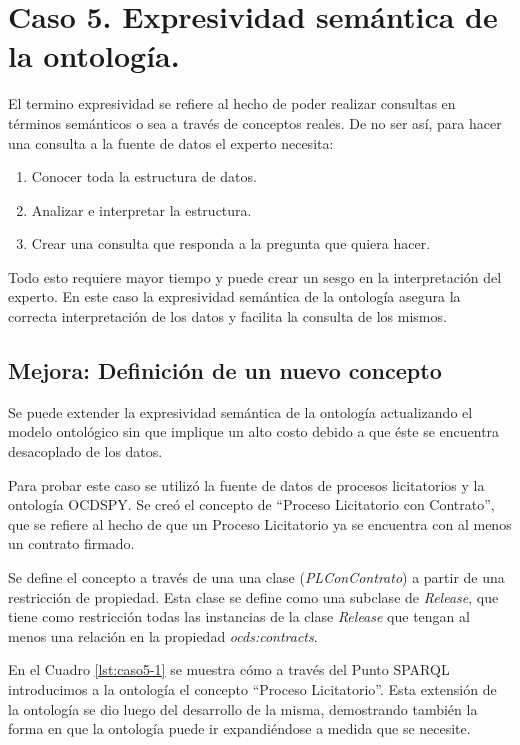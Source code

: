 \section{Caso 5. Expresividad semántica de la ontología. }
\label{section:caso5}

El termino expresividad se refiere al hecho de poder realizar consultas en términos semánticos o sea a través de conceptos reales. De no ser así, para hacer una consulta a la fuente de datos el experto necesita:

\begin{enumerate}
    \item Conocer toda la estructura de datos.
    \item Analizar e interpretar la estructura.
    \item Crear una consulta que responda a la pregunta que quiera hacer.
\end{enumerate}

Todo esto requiere mayor tiempo y puede crear un sesgo en la interpretación del experto. En este caso la expresividad semántica de la ontología asegura la correcta interpretación de los datos y facilita la consulta de los mismos.


\subsection{Mejora: Definición de un nuevo concepto}
Se puede extender la expresividad semántica de la ontología actualizando el modelo ontológico sin que implique un alto costo debido a que éste se encuentra desacoplado de los datos.

Para probar este caso se utilizó la fuente de datos de procesos licitatorios y la ontología OCDSPY.  Se creó el  concepto  de “Proceso Licitatorio con Contrato”, que se refiere al hecho de que un Proceso Licitatorio ya se encuentra con al menos un contrato firmado.

Se define el concepto a través de una una clase (\textit{PLConContrato}) a partir de una restricción de propiedad. Esta clase se define como una subclase de \textit{Release}, que tiene como restricción todas las instancias de la clase \textit{Release} que tengan al menos una relación en la propiedad \textit{ocds:contracts}.

En el Cuadro \ref{lst:caso5-1} se muestra cómo a través del Punto SPARQL introducimos a la ontología el concepto “Proceso Licitatorio”. Esta extensión de la ontología se dio luego del desarrollo de la misma, demostrando también la forma en que la ontología puede ir expandiéndose a medida que se necesite.

